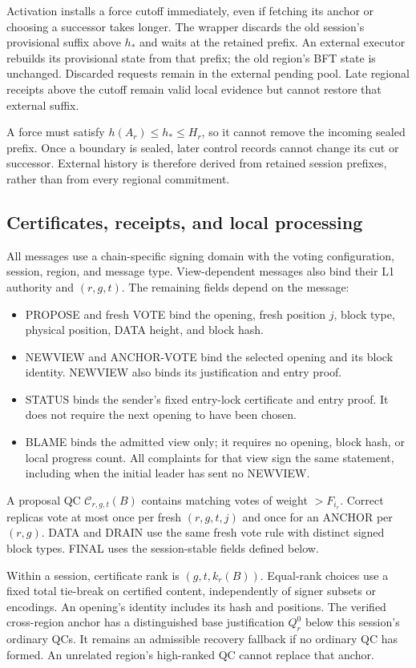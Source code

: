 \documentclass[11pt,a4paper]{article}
\newcommand{\QC}{\mathcal C}
\begin{document}
Activation installs a force cutoff immediately, even if fetching its
anchor or choosing a successor takes longer. The wrapper discards the
old session's provisional suffix above $h_*$ and waits at the retained
prefix. An external executor rebuilds its provisional state from that
prefix; the old region's BFT state is unchanged. Discarded requests
remain in the external pending pool. Late regional receipts above the
cutoff remain valid local evidence but cannot restore that external suffix.

A force must satisfy $h(A_r)\le h_*\le H_r$, so it cannot remove the
incoming sealed prefix. Once a boundary is sealed, later control records
cannot change its cut or successor. External history is therefore derived
from retained session prefixes, rather than from every regional commitment.

\subsection{Certificates, receipts, and local processing}
All messages use a chain-specific signing domain with the voting
configuration, session, region, and message type. View-dependent
messages also bind their L1 authority and $(r,g,t)$. The remaining fields
depend on the message:
\begin{itemize}
\item PROPOSE and fresh VOTE bind the opening, fresh position $j$,
block type, physical position, DATA height, and block hash.
\item NEWVIEW and ANCHOR-VOTE bind the selected opening and its block
identity. NEWVIEW also binds its justification and entry proof.
\item STATUS binds the sender's fixed entry-lock certificate and entry
proof. It does not require the next opening to have been chosen.
\item BLAME binds the admitted view only; it requires no opening, block
hash, or local progress count. All complaints for that view sign the same
statement, including when the initial leader has sent no NEWVIEW.
\end{itemize}
A proposal QC $\QC_{r,g,t}(B)$ contains matching votes of weight
$>F_{i_r}$. Correct replicas vote at most once per fresh $(r,g,t,j)$
and once for an ANCHOR per $(r,g)$. DATA and DRAIN use the same fresh
vote rule with distinct signed block types. FINAL uses the session-stable
fields defined below.

Within a session, certificate rank is $(g,t,k_r(B))$. Equal-rank choices
use a fixed total tie-break on certified content, independently of signer
subsets or encodings. An opening's identity includes its hash and positions.
The verified cross-region anchor has a distinguished base justification
$Q_r^0$ below this session's ordinary QCs. It remains an admissible
recovery fallback if no ordinary QC has formed. An unrelated region's high-ranked QC
cannot replace that anchor.
\end{document}
